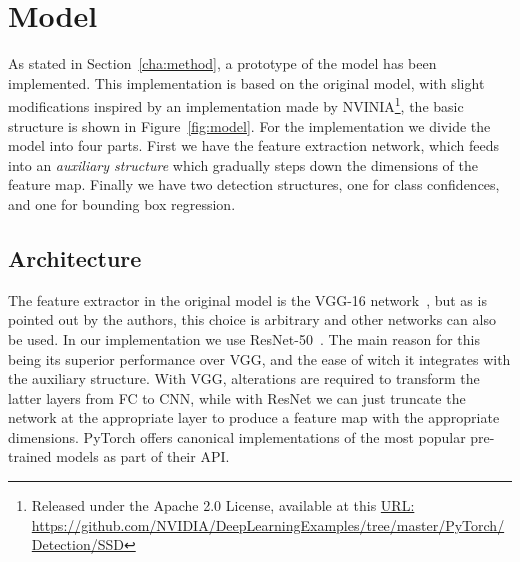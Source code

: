 \section{Model}\label{sec:model}
As stated in Section~\ref{cha:method}, a prototype of the model has been implemented.
This implementation is based on the original model, with slight modifications inspired by an implementation made by NVINIA\footnote{Released under the Apache 2.0 License, available at this \href{https://github.com/NVIDIA/DeepLearningExamples/tree/master/PyTorch/Detection/SSD}{URL:} \url{https://github.com/NVIDIA/DeepLearningExamples/tree/master/PyTorch/Detection/SSD}}, the basic structure is shown in Figure~\ref{fig:model}.
For the implementation we divide the model into four parts.
First we have the feature extraction network, which feeds into an \textit{auxiliary structure} which gradually steps down the dimensions of the feature map.
Finally we have two detection structures, one for class confidences, and one for bounding box regression.

\subsection{Architecture}
The feature extractor in the original model is the VGG-16 network~\parencite{simonyan2015deep}, but as is pointed out by the authors, this choice is arbitrary and other networks can also be used.
In our implementation we use ResNet-50~\parencite{he2015deep}.
The main reason for this being its superior performance over VGG, and the ease of witch it integrates with the auxiliary structure.
With VGG, alterations are required to transform the latter layers from FC to CNN, while with ResNet we can just truncate the network at the appropriate layer to produce a feature map with the appropriate dimensions.
PyTorch offers canonical implementations of the most popular pre-trained models as part of their API\@.

